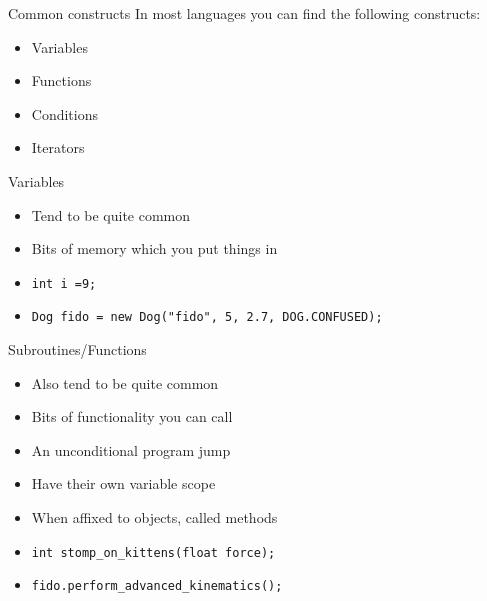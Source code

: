 \documentclass[10pt]{beamer}
\begin{document}
\begin{frame}{Common constructs}
  In most languages you can find the following constructs:
  \begin{itemize}
    \item Variables
    \item Functions
    \item Conditions
    \item Iterators
  \end{itemize}
\end{frame}

\begin{frame}{Variables}
  \begin{itemize}
    \item Tend to be quite common
    \item Bits of memory which you put things in
    \item \texttt{int i =9;}
    \item \texttt{Dog fido = new Dog("fido", 5, 2.7, DOG.CONFUSED);}
  \end{itemize}
\end{frame}

\begin{frame}{Subroutines/Functions}
  \begin{itemize}
    \item Also tend to be quite common
    \item Bits of functionality you can call
    \item An unconditional program jump
    \item Have their own variable scope
    \item When affixed to objects, called methods
    \item \texttt{int stomp\_on\_kittens(float force);}
    \item \texttt{fido.perform\_advanced\_kinematics();}
  \end{itemize}
\end{frame}
\end{document}
